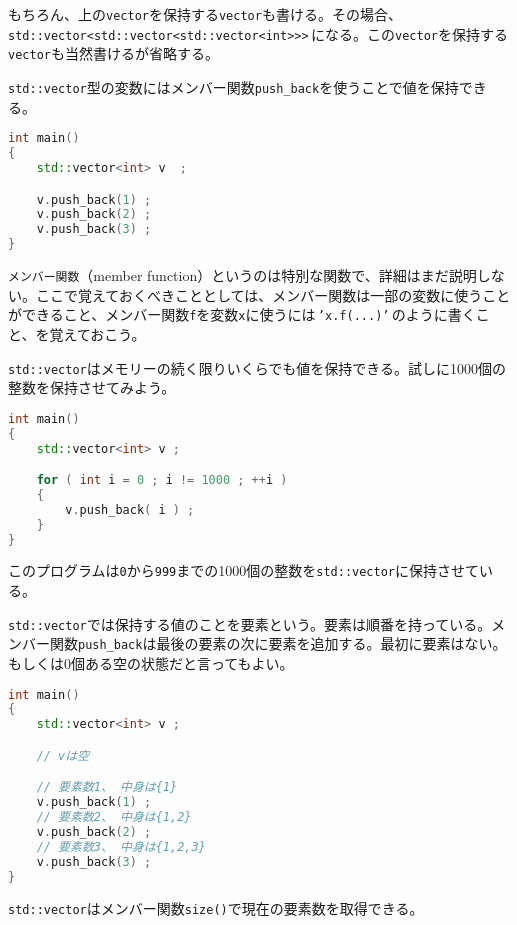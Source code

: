 もちろん、上の\texttt{vector}を保持する\texttt{vector}も書ける。その場合、\texttt{std::vector<std::vector<std::{\allowbreak}vector<int>{>}{>}}\,になる。この\texttt{vector}を保持する\texttt{vector}も当然書けるが省略する。

\texttt{std::vector}型の変数にはメンバー関数\texttt{push\_back}を使うことで値を保持できる。

\begin{lstlisting}[language={C++}]
int main()
{
    std::vector<int> v  ;

    v.push_back(1) ;
    v.push_back(2) ;
    v.push_back(3) ;
}
\end{lstlisting}

\texttt{メンバー関数}（member function）というのは特別な関数で、詳細はまだ説明しない。ここで覚えておくべきこととしては、メンバー関数は一部の変数に使うことができること、メンバー関数\texttt{f}を変数\texttt{x}に使うには\,\texttt{'x.f(...)'}\,のように書くこと、を覚えておこう。

\texttt{std::vector}はメモリーの続く限りいくらでも値を保持できる。試しに1000個の整数を保持させてみよう。

\begin{lstlisting}[language={C++}]
int main()
{
    std::vector<int> v ;

    for ( int i = 0 ; i != 1000 ; ++i )
    {
        v.push_back( i ) ;
    }
}
\end{lstlisting}

このプログラムは\texttt{0}から\texttt{999}までの1000個の整数を\texttt{std::vector}に保持させている。

\texttt{std::vector}では保持する値のことを要素という。要素は順番を持っている。メンバー関数\texttt{push\_back}は最後の要素の次に要素を追加する。最初に要素はない。もしくは0個ある空の状態だと言ってもよい。

\begin{lstlisting}[language={C++}]
int main()
{
    std::vector<int> v ;

    // vは空

    // 要素数1、 中身は{1}
    v.push_back(1) ;
    // 要素数2、 中身は{1,2}
    v.push_back(2) ;
    // 要素数3、 中身は{1,2,3}
    v.push_back(3) ;
}
\end{lstlisting}

\texttt{std::vector}はメンバー関数\texttt{size()}で現在の要素数を取得できる。

